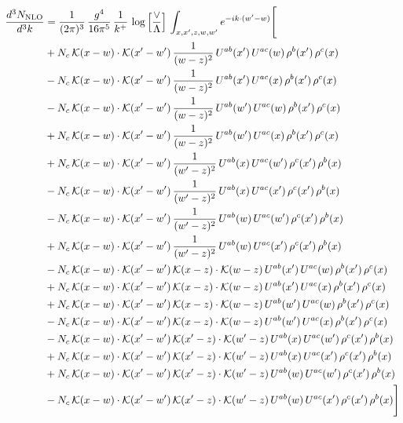 \documentclass[9pt]{article}
\numberwithin{equation}{section}
\begin{document}
\begin{align}
\frac{d^3N_{\rm NLO}}{d^3k} & =  \frac{1}{(2\pi)^{3}}\,\frac{g^{4}}{16\pi^{5}}\,\frac{1}{k^{+}}\,\log{\left[\frac{\vee}{\Lambda}\right]}\, \int_{x,x',z,w,w'}e^{-ik\cdot(w'-w)}\Bigg[\notag\\
&+N_{c}\,\mathcal{K}(x-w)\cdot\mathcal{K}(x'-w')\,\frac{1}{(w-z)^{2}}\,U^{ab}(x')\,U^{ac}(w)\,\rho^{b}(x')\,\rho^{c}(x)\notag\\
&-N_{c}\,\mathcal{K}(x-w)\cdot\mathcal{K}(x'-w')\,\frac{1}{(w-z)^{2}}\,U^{ab}(x')\,U^{ac}(x)\,\rho^{b}(x')\,\rho^{c}(x)\notag\\
&-N_{c}\,\mathcal{K}(x-w)\cdot\mathcal{K}(x'-w')\,\frac{1}{(w-z)^{2}}\,U^{ab}(w')\,U^{ac}(w)\,\rho^{b}(x')\,\rho^{c}(x)\notag\\
&+N_{c}\,\mathcal{K}(x-w)\cdot\mathcal{K}(x'-w')\,\frac{1}{(w-z)^{2}}\,U^{ab}(w')\,U^{ac}(x)\,\rho^{b}(x')\,\rho^{c}(x)\notag\\
&+N_{c}\,\mathcal{K}(x-w)\cdot\mathcal{K}(x'-w')\,\frac{1}{(w'-z)^{2}}\,U^{ab}(x)\,U^{ac}(w')\,\rho^{c}(x')\,\rho^{b}(x)\notag\\
&-N_{c}\,\mathcal{K}(x-w)\cdot\mathcal{K}(x'-w')\,\frac{1}{(w'-z)^{2}}\,U^{ab}(x)\,U^{ac}(x')\,\rho^{c}(x')\,\rho^{b}(x)\notag\\
&-N_{c}\,\mathcal{K}(x-w)\cdot\mathcal{K}(x'-w')\,\frac{1}{(w'-z)^{2}}\,U^{ab}(w)\,U^{ac}(w')\,\rho^{c}(x')\,\rho^{b}(x)\notag\\
&+N_{c}\,\mathcal{K}(x-w)\cdot\mathcal{K}(x'-w')\,\frac{1}{(w'-z)^{2}}\,U^{ab}(w)\,U^{ac}(x')\,\rho^{c}(x')\,\rho^{b}(x)\notag\\
&-N_{c}\,\mathcal{K}(x-w)\cdot\mathcal{K}(x'-w')\,\mathcal{K}(x-z)\cdot\mathcal{K}(w-z)\,U^{ab}(x')\,U^{ac}(w)\,\rho^{b}(x')\,\rho^{c}(x)\notag\\
&+N_{c}\,\mathcal{K}(x-w)\cdot\mathcal{K}(x'-w')\,\mathcal{K}(x-z)\cdot\mathcal{K}(w-z)\,U^{ab}(x')\,U^{ac}(x)\,\rho^{b}(x')\,\rho^{c}(x)\notag\\
&+N_{c}\,\mathcal{K}(x-w)\cdot\mathcal{K}(x'-w')\,\mathcal{K}(x-z)\cdot\mathcal{K}(w-z)\,U^{ab}(w')\,U^{ac}(w)\,\rho^{b}(x')\,\rho^{c}(x)\notag\\
&-N_{c}\,\mathcal{K}(x-w)\cdot\mathcal{K}(x'-w')\,\mathcal{K}(x-z)\cdot\mathcal{K}(w-z)\,U^{ab}(w')\,U^{ac}(x)\,\rho^{b}(x')\,\rho^{c}(x)\notag\\
&-N_{c}\,\mathcal{K}(x-w)\cdot\mathcal{K}(x'-w')\,\mathcal{K}(x'-z)\cdot\mathcal{K}(w'-z)\,U^{ab}(x)\,U^{ac}(w')\,\rho^{c}(x')\,\rho^{b}(x)\notag\\
&+N_{c}\,\mathcal{K}(x-w)\cdot\mathcal{K}(x'-w')\,\mathcal{K}(x'-z)\cdot\mathcal{K}(w'-z)\,U^{ab}(x)\,U^{ac}(x')\,\rho^{c}(x')\,\rho^{b}(x)\notag\\
&+N_{c}\,\mathcal{K}(x-w)\cdot\mathcal{K}(x'-w')\,\mathcal{K}(x'-z)\cdot\mathcal{K}(w'-z)\,U^{ab}(w)\,U^{ac}(w')\,\rho^{c}(x')\,\rho^{b}(x)\notag\\
&-N_{c}\,\mathcal{K}(x-w)\cdot\mathcal{K}(x'-w')\,\mathcal{K}(x'-z)\cdot\mathcal{K}(w'-z)\,U^{ab}(w)\,U^{ac}(x')\,\rho^{c}(x')\,\rho^{b}(x)\Bigg]
\end{align}
\end{document}
